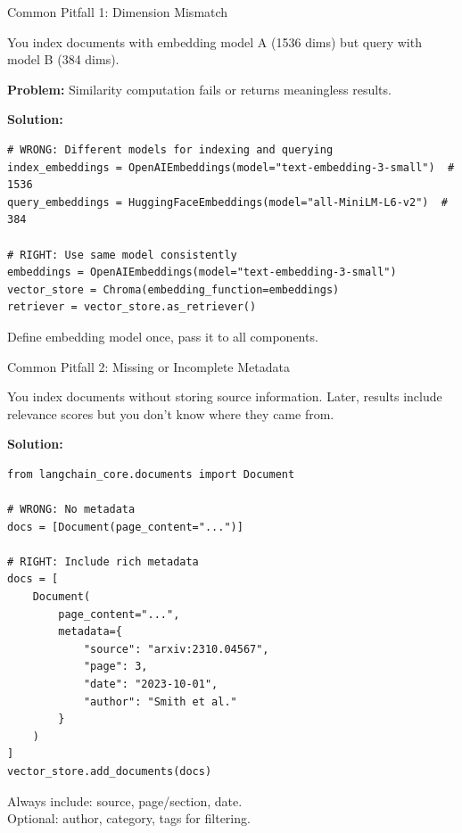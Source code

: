 \documentclass[aspectratio=169,11pt]{beamer}
\begin{document}
\begin{frame}[fragile]{Common Pitfall 1: Dimension Mismatch}
  \begin{warningbox}
    You index documents with embedding model A (1536 dims) but query with model B (384 dims).
  \end{warningbox}

  \vspace{0.05cm}
  \textbf{Problem:} Similarity computation fails or returns meaningless results.

  \vspace{0.05cm}
  \textbf{Solution:}
  \begin{lstlisting}[basicstyle=\ttfamily\tiny]
# WRONG: Different models for indexing and querying
index_embeddings = OpenAIEmbeddings(model="text-embedding-3-small")  # 1536
query_embeddings = HuggingFaceEmbeddings(model="all-MiniLM-L6-v2")  # 384

# RIGHT: Use same model consistently
embeddings = OpenAIEmbeddings(model="text-embedding-3-small")
vector_store = Chroma(embedding_function=embeddings)
retriever = vector_store.as_retriever()
  \end{lstlisting}

  \begin{tipbox}
    Define embedding model once, pass it to all components.
  \end{tipbox}
\end{frame}

\begin{frame}[fragile,shrink=20]{Common Pitfall 2: Missing or Incomplete Metadata}
  \begin{warningbox}
    You index documents without storing source information. Later, results include relevance scores but you don't know where they came from.
  \end{warningbox}

  \vspace{0.05cm}
  \textbf{Solution:}
  \begin{lstlisting}[basicstyle=\ttfamily\tiny]
from langchain_core.documents import Document

# WRONG: No metadata
docs = [Document(page_content="...")]

# RIGHT: Include rich metadata
docs = [
    Document(
        page_content="...",
        metadata={
            "source": "arxiv:2310.04567",
            "page": 3,
            "date": "2023-10-01",
            "author": "Smith et al."
        }
    )
]
vector_store.add_documents(docs)
  \end{lstlisting}

  \begin{tipbox}
    Always include: source, page/section, date.\\
    Optional: author, category, tags for filtering.
  \end{tipbox}
\end{frame}
\end{document}
